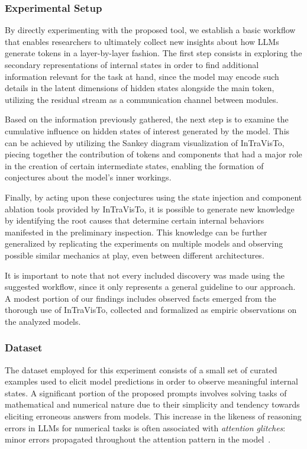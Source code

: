 \subsubsection{Experimental Setup}\label{sssec:exp_intravisto_exp4_expset}

By directly experimenting with the proposed tool, we establish a basic workflow that enables researchers to ultimately collect new insights about how LLMs generate tokens in a layer-by-layer fashion.
The first step consists in exploring the secondary representations of internal states in order to find additional information relevant for the task at hand, since the model may encode such details in the latent dimensions of hidden states alongside the main token, utilizing the residual stream as a communication channel between modules.

Based on the information previously gathered, the next step is to examine the cumulative influence on hidden states of interest generated by the model.
This can be achieved by utilizing the Sankey diagram visualization of InTraVisTo, piecing together the contribution of tokens and components that had a major role in the creation of certain intermediate states, enabling the formation of conjectures about the model's inner workings.

Finally, by acting upon these conjectures using the state injection and component ablation tools provided by InTraVisTo, it is possible to generate new knowledge by identifying the root causes that determine certain internal behaviors manifested in the preliminary inspection.
This knowledge can be further generalized by replicating the experiments on multiple models and observing possible similar mechanics at play, even between different architectures.

It is important to note that not every included discovery was made using the suggested workflow, since it only represents a general guideline to our approach.
A modest portion of our findings includes observed facts emerged from the thorough use of InTraVisTo, collected and formalized as empiric observations on the analyzed models.

\subsubsection{Dataset}

The dataset employed for this experiment consists of a small set of curated examples used to elicit model predictions in order to observe meaningful internal states.
A significant portion of the proposed prompts involves solving tasks of mathematical and numerical nature due to their simplicity and tendency towards eliciting erroneous answers from models.
This increase in the likeness of reasoning errors in LLMs for numerical tasks is often associated with \emph{attention glitches}: minor errors propagated throughout the attention pattern in the model~\cite{liu2023}.

